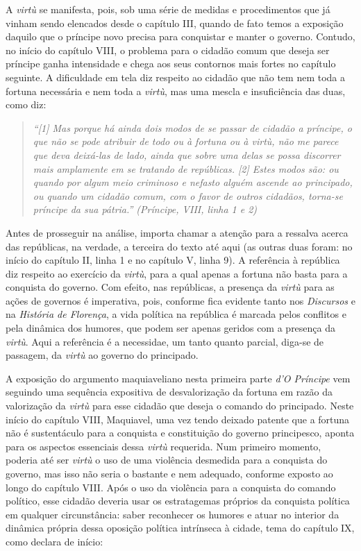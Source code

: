 A \emph{virtù} se manifesta, pois, sob uma série de medidas e
procedimentos que já vinham sendo elencados desde o capítulo III, quando
de fato temos a exposição daquilo que o príncipe novo precisa para
conquistar e manter o governo. Contudo, no início do capítulo VIII, o
problema para o cidadão comum que deseja ser príncipe ganha intensidade
e chega aos seus contornos mais fortes no capítulo seguinte. A
dificuldade em tela diz respeito ao cidadão que não tem nem toda a
fortuna necessária e nem toda a \emph{virtù}, mas uma mescla e
insuficiência das duas, como diz:

\begin{quote}
\emph{``{[}1{]} Mas porque há ainda dois modos de se passar de cidadão a
príncipe, o que não se pode atribuir de todo ou à fortuna ou à virtù,
não me parece que deva deixá-las de lado, ainda que sobre uma delas se
possa discorrer mais amplamente em se tratando de repúblicas. {[}2{]}
Estes modos são: ou quando por algum meio criminoso e nefasto alguém
ascende ao principado, ou quando um cidadão comum, com o favor de outros
cidadãos, torna-se príncipe da sua pátria.'' (Príncipe, VIII, linha 1 e
2)}
\end{quote}

Antes de prosseguir na análise, importa chamar a atenção para a ressalva
acerca das repúblicas, na verdade, a terceira do texto até aqui (as
outras duas foram: no início do capítulo II, linha 1 e no capítulo V,
linha 9). A referência à república diz respeito ao exercício da
\emph{virtù}, para a qual apenas a fortuna não basta para a conquista do
governo. Com efeito, nas repúblicas, a presença da \emph{virtù} para as
ações de governos é imperativa, pois, conforme fica evidente tanto nos
\emph{Discursos} e na \emph{História de Florença}, a vida política na
república é marcada pelos conflitos e pela dinâmica dos humores, que
podem ser apenas geridos com a presença da \emph{virtù}. Aqui a
referência é a necessidae, um tanto quanto parcial, diga-se de passagem,
da \emph{virtù} ao governo do principado.

A exposição do argumento maquiaveliano nesta primeira parte \emph{d'O
Príncipe} vem seguindo uma sequência expositiva de desvalorização da
fortuna em razão da valorização da \emph{virtù} para esse cidadão que
deseja o comando do principado. Neste início do capítulo VIII,
Maquiavel, uma vez tendo deixado patente que a fortuna não é
sustentáculo para a conquista e constituição do governo principesco,
aponta para os aspectos essenciais dessa \emph{virtù} requerida. Num
primeiro momento, poderia até ser \emph{virtù} o uso de uma violência
desmedida para a conquista do governo, mas isso não seria o bastante e
nem adequado, conforme exposto ao longo do capítulo VIII. Após o uso da
violência para a conquista do comando político, esse cidadão deveria
usar os estratagemas próprios da conquista política em qualquer
circunstância: saber reconhecer os humores e atuar no interior da
dinâmica própria dessa oposição política intrínseca à cidade, tema do
capítulo IX, como declara de início:


